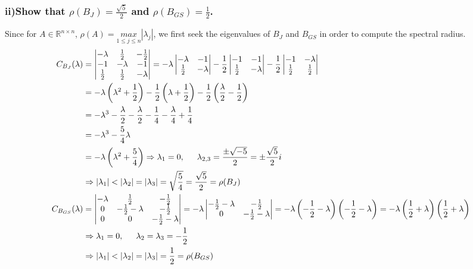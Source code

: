 \documentclass[11pt, letterpaper]{article}
\begin{document}
\subsubsection*{ii)\normalfont Show that $\rho\left(B_J\right)=\frac{\sqrt{5}}{2}$ and $\rho\left(B_{GS}\right)=\frac{1}{2}$.}
Since for $A\in\mathbb{R}^{n\times n}$, $\rho(A)=\underset{1\leq j\leq n}{max}|\lambda_j|$, we first 
seek the eigenvalues of $B_J$ and $B_{GS}$ in order to compute the spectral radius. 
\begin{align*}
    C_{B_J}(\lambda)&=
    \begin{vmatrix}
        -\lambda & \frac{1}{2} & -\frac{1}{2}\\
        -1 & -\lambda & -1\\
        \frac{1}{2} & \frac{1}{2} & -\lambda 
    \end{vmatrix}
    =-\lambda
    \begin{vmatrix}
        -\lambda & -1\\
        \frac{1}{2} & -\lambda
    \end{vmatrix}
    -\frac{1}{2}
    \begin{vmatrix}
        -1 & -1\\
        \frac{1}{2} & -\lambda
    \end{vmatrix}
    -\frac{1}{2}
    \begin{vmatrix}
        -1 & -\lambda\\
        \frac{1}{2} & \frac{1}{2}
    \end{vmatrix}\\
    &=-\lambda\left(\lambda^2+\frac{1}{2}\right)-\frac{1}{2}\left(\lambda + \frac{1}{2}\right)-\frac{1}{2}\left(\frac{\lambda}{2}-\frac{1}{2}\right)\\
    &=-\lambda^3-\frac{\lambda}{2}-\frac{\lambda}{2} -\frac{1}{4} -\frac{\lambda}{4}+\frac{1}{4}\\
    &=-\lambda^3-\frac{5}{4}\lambda\\
    &=-\lambda\left(\lambda^2+\frac{5}{4}\right)\Rightarrow \lambda_1=0,\indent \lambda_{2,3}=\frac{\pm\sqrt{-5}}{2}=\pm\frac{\sqrt{5}}{2}i\\
    &\Rightarrow|\lambda_1|<|\lambda_2|=|\lambda_3|=\sqrt{\frac{5}{4}}=\frac{\sqrt{5}}{2}=\rho(B_J)\\
    C_{B_{GS}}(\lambda)&=
    \begin{vmatrix}
        -\lambda & \frac{1}{2} & -\frac{1}{2}\\
        0 & -\frac{1}{2}-\lambda & -\frac{1}{2}\\
        0 & 0 & -\frac{1}{2}-\lambda
    \end{vmatrix}
    =-\lambda
    \begin{vmatrix}
        -\frac{1}{2}-\lambda & -\frac{1}{2}\\
        0 & -\frac{1}{2}-\lambda
    \end{vmatrix}
    =-\lambda\left(-\frac{1}{2}-\lambda\right)\left(-\frac{1}{2}-\lambda\right)=-\lambda\left(\frac{1}{2}+\lambda\right)\left(\frac{1}{2}+\lambda\right)\\
    &\Rightarrow \lambda_1=0,\indent\lambda_2=\lambda_3=-\frac{1}{2}\\
    &\Rightarrow |\lambda_1|<|\lambda_2|=|\lambda_3|=\frac{1}{2}=\rho(B_{GS})
\end{align*}
\end{document}
